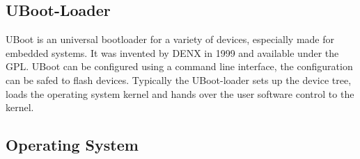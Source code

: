 \subsection{UBoot-Loader}
UBoot is an universal bootloader for a variety of devices, especially made for embedded systems. It was invented by DENX in 1999 and available under the GPL. UBoot can be configured using a command line interface, the configuration can be safed to flash devices. Typically the UBoot-loader sets up the device tree, loads the operating system kernel and hands over the user software control to the kernel.
\subsection{Operating System}